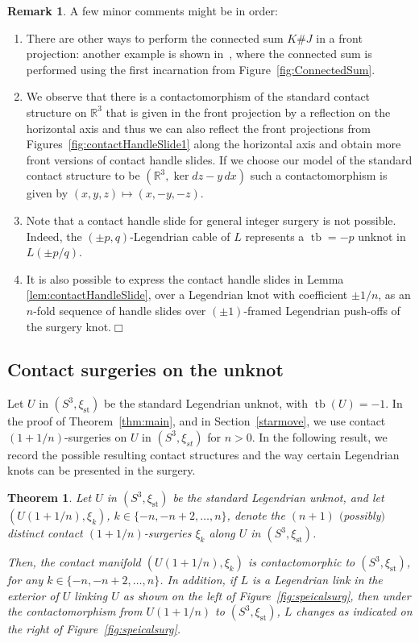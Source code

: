 \documentclass[11pt]{amsart} %
\DeclareMathOperator{\tb}{tb}
\newcommand{\R}{\mathbb{R}}
\newcommand{\xist}{\xi_{\mathrm{st}}}
\theoremstyle{plain}
\newtheorem{thm}[Theorem]{Theorem}
\theoremstyle{definition}
\newtheorem{rem}[Theorem]{Remark}
\begin{document}
\begin{rem} A few minor comments might be in order:
	
\begin{enumerate}
	\item There are other ways to perform the connected sum $K\#J$ in a front projection: another example is shown in~\cite{DingGeiges09}, where the connected sum is performed using the first incarnation from Figure~\ref{fig:ConnectedSum}.	
	\item We observe that there is a contactomorphism of the standard contact structure on $\R^3$ that is given in the front projection by a reflection on the horizontal axis and thus we can also reflect the front projections from Figures~\ref{fig:contactHandleSlide1} along the horizontal axis and obtain more front versions of contact handle slides. If we choose our model of the standard contact structure to be $(\R^3,\ker dz - y\, dx)$ such a contactomorphism is given by $(x,y,z)\mapsto(x,-y,-z)$.
	\item Note that a contact handle slide for general integer surgery is not possible. Indeed, the $(\pm p,q)$-Legendrian cable of $L$ represents a $\tb=-p$ unknot in $L(\pm p/q)$.	
	\item It is also possible to express the contact handle slides in Lemma \ref{lem:contactHandleSlide}, over a Legendrian knot with coefficient $\pm 1/n$, as an $n$-fold sequence of handle slides over $(\pm1)$-framed Legendrian push-offs of the surgery knot.\hfill$\Box$
\end{enumerate}
\end{rem}

\subsection{Contact surgeries on the unknot}
Let $U$ in $(S^3,\xist)$ be the standard Legendrian unknot, with $\tb(U)=-1$. In the proof of Theorem~\ref{thm:main}, and in Section~\ref{starmove}, we use contact $(1+1/n)$-surgeries on $U$ in $(S^3,\xi_{st})$ for $n>0$. In the following result, we record the possible resulting contact structures and the way certain Legendrian knots can be presented in the surgery.

\begin{thm}\label{surgerytoS3}
Let $U$ in $(S^3,\xist)$ be the standard Legendrian unknot, and let $(U(1+1/n),\xi_k)$, $k\in \{-n, -n+2, \ldots, n\}$, denote the $(n+1)$ $($possibly$)$ distinct contact $(1+1/n)$-surgeries $\xi_k$ along $U$ in $(S^3,\xist)$.

Then, the contact manifold $(U(1+1/n),\xi_k)$ is contactomorphic to $(S^3,\xist)$, for any $k\in \{-n, -n+2, \ldots, n\}$. In addition, if $L$ is a Legendrian link in the exterior of $U$ linking $U$ as shown on the left of Figure~\ref{fig:speicalsurg}, then under the contactomorphism from $U(1+1/n)$ to $(S^3,\xist)$, $L$ changes as indicated on the right of Figure~\ref{fig:speicalsurg}. 
\end{thm}
\end{document}
